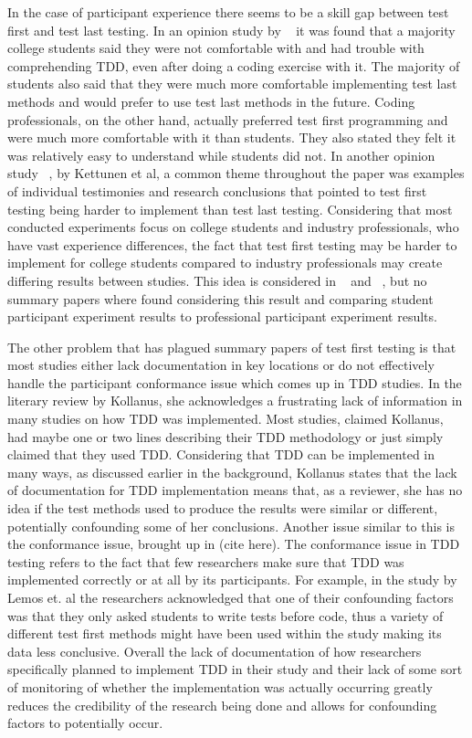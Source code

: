 \documentclass{sig-alternate}
\begin{document}
In the case of participant experience there seems to be a skill gap between test first and test last testing.  In an opinion study by ~\cite{Janzen:2007} it was found that a majority college students said they were not comfortable with and had trouble with comprehending TDD, even after doing a coding exercise with it.  The majority of students also said that they were much more comfortable implementing test last methods and would prefer to use test last methods in the future.  Coding professionals, on the other hand, actually preferred test first programming and were much more comfortable with it than students.  They also stated they felt it was relatively easy to understand while students did not. In another opinion study ~\cite{Kettunen:2010}, by Kettunen et al, a common theme throughout the paper was examples of individual testimonies and research conclusions that pointed to test first testing being harder to implement than test last testing.   Considering that most conducted experiments focus on college students and industry professionals, who have vast experience differences, the fact that test first testing may be harder to implement for college students compared to industry professionals may create differing results between studies.   This idea is considered in ~\cite{Hammond:2012} and ~\cite{Kettunen:2010}, but no summary papers where found considering this result and comparing student participant experiment results to professional participant experiment results.

The other problem that has plagued summary papers of test first testing is that most studies either lack documentation in key locations or do not effectively handle the participant conformance issue which comes up in TDD studies.  In the literary review by Kollanus, she acknowledges a frustrating lack of information in many studies on how TDD was implemented.  Most studies, claimed Kollanus, had maybe one or two lines describing their TDD methodology or just simply claimed that they used TDD.  Considering that TDD can be implemented in many ways, as discussed earlier in the background, Kollanus states that the lack of documentation for TDD implementation means that, as a reviewer, she has no idea if the test methods used to produce the results were similar or different, potentially confounding some of her conclusions.  Another issue similar to this is the conformance issue, brought up in (cite here).  The conformance issue in TDD testing refers to the fact that few researchers make sure that TDD was implemented correctly or at all by its participants.  For example, in the study by Lemos et. al the researchers acknowledged that one of their confounding factors was that they only asked students to write tests before code, thus a variety of different test first methods might have been used within the study making its data less conclusive.   Overall the lack of documentation of how researchers specifically planned to implement TDD in their study and their lack of some sort of monitoring of whether the implementation was actually occurring greatly reduces the credibility of the research being done and allows for confounding factors to potentially occur. 
\end{document}
